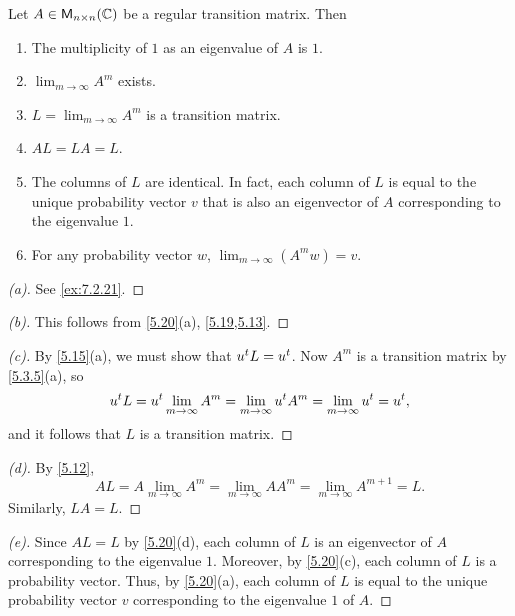 \begin{thm}\label{5.20}
  Let \(A \in \mathsf{M}_{{n} \times n}({\mathbb{C}})\) be a regular transition matrix.
  Then
  \begin{enumerate}
    \item The multiplicity of \(1\) as an eigenvalue of \(A\) is \(1\).
    \item \(\lim_{m \to \infty} A^m\) exists.
    \item \(L = \lim_{m \to \infty} A^m\) is a transition matrix.
    \item \(AL = LA = L\).
    \item The columns of \(L\) are identical.
          In fact, each column of \(L\) is equal to the unique probability vector \(v\) that is also an eigenvector of \(A\) corresponding to the eigenvalue \(1\).
    \item For any probability vector \(w\), \(\lim_{m \to \infty} (A^m w) = v\).
  \end{enumerate}
\end{thm}

\begin{proof}[(a)]
  See \cref{ex:7.2.21}.
\end{proof}

\begin{proof}[(b)]
  This follows from \cref{5.20}(a), \cref{5.19,5.13}.
\end{proof}

\begin{proof}[(c)]
  By \cref{5.15}(a), we must show that \({u}^{t} L = {u}^{t}\).
  Now \(A^m\) is a transition matrix by \cref{5.3.5}(a), so
  \[
    {u}^{t} L = {u}^{t} \lim_{m \to \infty} A^m = \lim_{m \to \infty} {u}^{t} A^m = \lim_{m \to \infty} {u}^{t} = {u}^{t},
  \]
  and it follows that \(L\) is a transition matrix.
\end{proof}

\begin{proof}[(d)]
  By \cref{5.12},
  \[
    AL = A \lim_{m \to \infty} A^m = \lim_{m \to \infty} AA^m = \lim_{m \to \infty} A^{m + 1} = L.
  \]
  Similarly, \(LA = L\).
\end{proof}

\begin{proof}[(e)]
  Since \(AL = L\) by \cref{5.20}(d), each column of \(L\) is an eigenvector of \(A\) corresponding to the eigenvalue \(1\).
  Moreover, by \cref{5.20}(c), each column of \(L\) is a probability vector.
  Thus, by \cref{5.20}(a), each column of \(L\) is equal to the unique probability vector \(v\) corresponding to the eigenvalue \(1\) of \(A\).
\end{proof}

